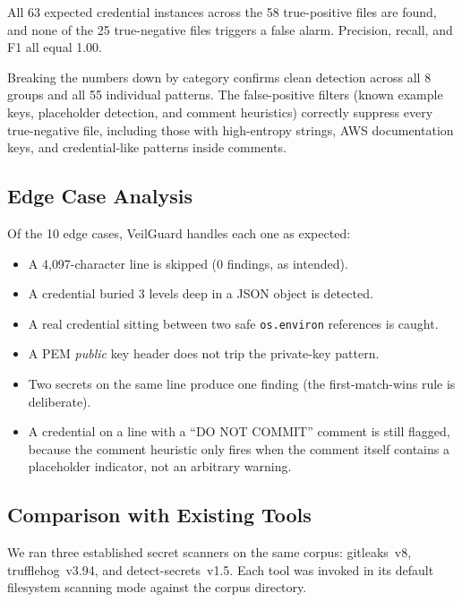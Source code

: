 \documentclass[conference]{IEEEtran}
\begin{document}
All 63 expected credential instances across the 58 true-positive files are
found, and none of the 25 true-negative files triggers a false alarm. Precision,
recall, and F1 all equal 1.00.

Breaking the numbers down by category confirms clean detection across all 8
groups and all 55 individual patterns. The false-positive filters (known example
keys, placeholder detection, and comment heuristics) correctly suppress
every true-negative file, including those with high-entropy strings, AWS
documentation keys, and credential-like patterns inside comments.

\subsection{Edge Case Analysis}

Of the 10 edge cases, VeilGuard handles each one as expected:

\begin{itemize}
  \item A 4{,}097-character line is skipped (0 findings, as intended).
  \item A credential buried 3 levels deep in a JSON object is detected.
  \item A real credential sitting between two safe \texttt{os.environ}
        references is caught.
  \item A PEM \emph{public} key header does not trip the private-key pattern.
  \item Two secrets on the same line produce one finding (the first-match-wins
        rule is deliberate).
  \item A credential on a line with a ``DO NOT COMMIT'' comment is still
        flagged, because the comment heuristic only fires when the comment
        itself contains a placeholder indicator, not an arbitrary warning.
\end{itemize}

\subsection{Comparison with Existing Tools}
\label{sec:comparison}

We ran three established secret scanners on the same corpus: gitleaks~v8,
trufflehog~v3.94, and detect-secrets~v1.5. Each tool was invoked in its default
filesystem scanning mode against the corpus directory.
\end{document}
